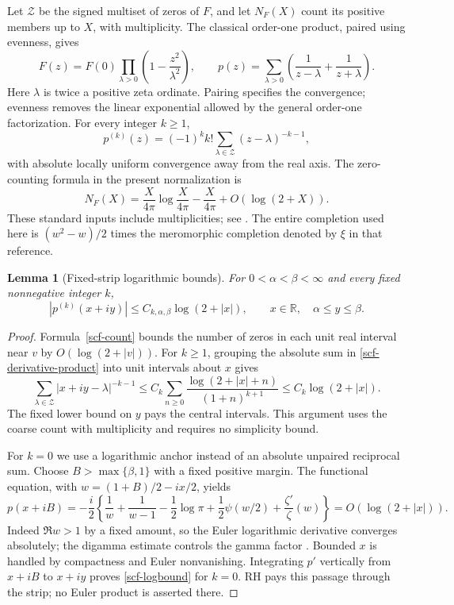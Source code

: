 \documentclass[11pt]{article}
\newcommand{\R}{\mathbb R}
\newtheorem{lemma}[theorem]{Lemma}
\theoremstyle{remark}
\begin{document}
Let $\mathcal Z$ be the signed multiset of zeros of $F$, and let $N_F(X)$
count its positive members up to $X$, with multiplicity.  The classical
order-one product, paired using evenness, gives
\begin{equation}\label{scf-product}
 F(z)=F(0)\prod_{\lambda>0}\left(1-\frac{z^2}{\lambda^2}\right),
 \qquad
 p(z)=\sum_{\lambda>0}
 \left(\frac1{z-\lambda}+\frac1{z+\lambda}\right).
\end{equation}
Here $\lambda$ is twice a positive zeta ordinate.  Pairing specifies the
convergence; evenness removes the linear exponential allowed by the
general order-one factorization.  For every integer $k\ge1$,
\begin{equation}\label{scf-derivative-product}
 p^{(k)}(z)=(-1)^k k!\sum_{\lambda\in\mathcal Z}
                     (z-\lambda)^{-k-1},
\end{equation}
with absolute locally uniform convergence away from the real axis.
The zero-counting formula in the present normalization is
\begin{equation}\label{scf-count}
 N_F(X)=\frac{X}{4\pi}\log\frac{X}{4\pi}-\frac{X}{4\pi}
              +O(\log(2+X)).
\end{equation}
These standard inputs include multiplicities; see \cite{Elkies}.
The entire completion used here is $(w^2-w)/2$ times the meromorphic
completion denoted by $\xi$ in that reference.

\begin{lemma}[Fixed-strip logarithmic bounds]\label{scf-strip-bounds}
For $0<\alpha<\beta<\infty$ and every fixed nonnegative integer $k$,
\begin{equation}\label{scf-logbound}
 |p^{(k)}(x+iy)|\le C_{k,\alpha,\beta}\log(2+|x|),
 \qquad x\in\R,\quad \alpha\le y\le\beta.
\end{equation}
\end{lemma}
\begin{proof}
Formula~\eqref{scf-count} bounds the number of zeros in each unit real
interval near $v$ by $O(\log(2+|v|))$.  For $k\ge1$, grouping the absolute
sum in \eqref{scf-derivative-product} into unit intervals about $x$ gives
\[
 \sum_{\lambda\in\mathcal Z}|x+iy-\lambda|^{-k-1}
 \le C_k\sum_{n\ge0}\frac{\log(2+|x|+n)}{(1+n)^{k+1}}
 \le C_k\log(2+|x|).
\]
The fixed lower bound on $y$ pays the central intervals.  This argument
uses the coarse count with multiplicity and requires no simplicity bound.

For $k=0$ we use a logarithmic anchor instead of an absolute unpaired
reciprocal sum.  Choose $B>\max\{\beta,1\}$ with a fixed positive margin.
The functional equation, with $w=(1+B)/2-ix/2$, yields
\[
 p(x+iB)=-\frac i2\left\{\frac1w+\frac1{w-1}
 -\frac12\log\pi+\frac12\psi(w/2)
 +\frac{\zeta'}{\zeta}(w)\right\}
 =O(\log(2+|x|)).
\]
Indeed $\Re w>1$ by a fixed amount, so the Euler logarithmic derivative
converges absolutely; the digamma estimate controls the gamma factor
\cite[\S\S 5.11, 25.4]{DLMF}.  Bounded $x$ is handled by compactness
and Euler nonvanishing.  Integrating $p'$ vertically from $x+iB$ to
$x+iy$ proves \eqref{scf-logbound} for $k=0$.  RH pays this passage
through the strip; no Euler product is asserted there.
\end{proof}
\end{document}
